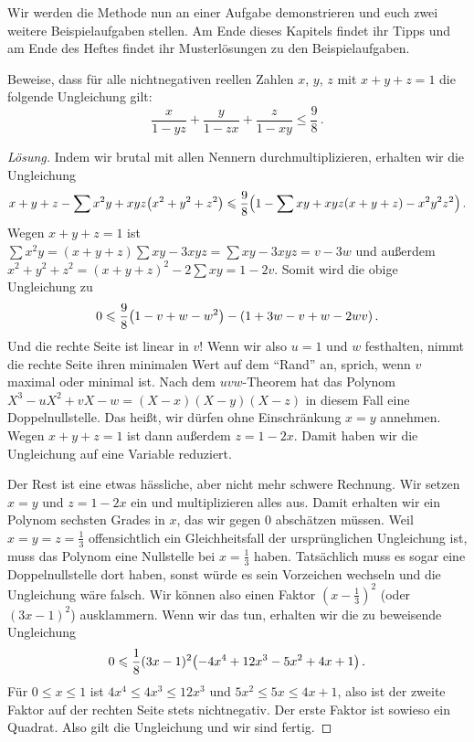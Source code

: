 Wir werden die Methode nun an einer Aufgabe demonstrieren und euch zwei weitere  Beispielaufgaben stellen. Am Ende dieses Kapitels findet ihr Tipps und am Ende des Heftes findet ihr Musterlösungen zu den Beispielaufgaben.
\begin{aufgabe*}
	Beweise, dass für alle nichtnegativen reellen Zahlen $x$, $y$, $z$ mit $x+y+z=1$ die folgende Ungleichung gilt:
	\begin{equation*}
		\frac{x}{1-yz}+\frac{y}{1-zx}+\frac{z}{1-xy}\leqslant\frac 98\,.
	\end{equation*}
\end{aufgabe*}
\begin{proof}[Lösung]
	Indem wir brutal mit allen Nennern durchmultiplizieren, erhalten wir die Ungleichung
	\begin{equation*}
		x+y+z-\sum x^2y+xyz\parens*{x^2+y^2+z^2}\leqslant \frac 98\parens*{1-\sum xy+xyz(x+y+z)-x^2y^2z^2}\,.
	\end{equation*}
	Wegen $x+y+z=1$ ist $\sum x^2y=(x+y+z)\sum xy-3xyz=\sum xy-3xyz=v-3w$ und außerdem $x^2+y^2+z^2=(x+y+z)^2-2\sum xy=1-2v$. Somit wird die obige Ungleichung zu
	\begin{equation*}
		0\leqslant \frac 98\parens*{1-v+w-w^2}-\parens*{1+3w-v+w-2wv}\,.
	\end{equation*}
	Und die rechte Seite ist linear in $v$! Wenn wir also $u=1$ und $w$ festhalten, nimmt die rechte Seite ihren minimalen Wert auf dem \enquote{Rand} an, sprich, wenn $v$ maximal oder minimal ist. Nach dem $uvw$-Theorem hat das Polynom $X^3-uX^2+vX-w=(X-x)(X-y)(X-z)$ in diesem Fall eine Doppelnullstelle. Das heißt, wir dürfen ohne Einschränkung $x=y$ annehmen. Wegen $x+y+z=1$ ist dann außerdem $z=1-2x$. Damit haben wir die Ungleichung auf eine Variable reduziert.
	
	Der Rest ist eine etwas hässliche, aber nicht mehr schwere Rechnung. Wir setzen $x=y$ und $z=1-2x$ ein und multiplizieren alles aus. Damit erhalten wir ein Polynom sechsten Grades in $x$, das wir gegen $0$ abschätzen müssen. Weil $x=y=z=\frac13$ offensichtlich ein Gleichheitsfall der ursprünglichen Ungleichung ist, muss das Polynom eine Nullstelle bei $x=\frac13$ haben. Tatsächlich muss es sogar eine Doppelnullstelle dort haben, sonst würde es sein Vorzeichen wechseln und die Ungleichung wäre falsch. Wir können also einen Faktor $(x-\frac13)^2$ (oder $(3x-1)^2$) ausklammern. Wenn wir das tun, erhalten wir die zu beweisende Ungleichung
	\begin{equation*}
		0\leqslant \frac18(3x-1)^2\parens*{-4x^4+12x^3-5x^2+4x+1}\,.
	\end{equation*}
	Für $0\leqslant x\leqslant 1$ ist $4x^4\leqslant 4x^3\leqslant 12x^3$ und $5x^2\leqslant 5x\leqslant 4x+1$, also ist der zweite Faktor auf der rechten Seite stets nichtnegativ. Der erste Faktor ist sowieso ein Quadrat. Also gilt die Ungleichung und wir sind fertig.
\end{proof}

